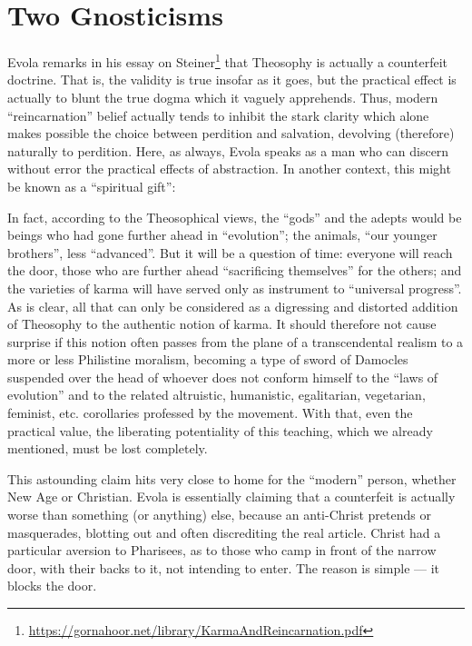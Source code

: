 \section{Two Gnosticisms}

Evola remarks in his essay on Steiner\footnote{\url{https://gornahoor.net/library/KarmaAndReincarnation.pdf}} that Theosophy is actually a counterfeit doctrine. That is, the validity is true insofar as it goes, but the practical effect is actually to blunt the true dogma which it vaguely apprehends. Thus, modern ``reincarnation'' belief actually tends to inhibit the stark clarity which alone makes possible the choice between perdition and salvation, devolving (therefore) naturally to perdition. Here, as always, Evola speaks as a man who can discern without error the practical effects of abstraction. In another context, this might be known as a ``spiritual gift'':

\begin{quotex}
In fact, according to the Theosophical views, the ``gods'' and the adepts would be beings who had gone further ahead in ``evolution''; the animals, ``our younger brothers'', less ``advanced''. But it will be a question of time: everyone will reach the door, those who are further ahead ``sacrificing themselves'' for the others; and the varieties of karma will have served only as instrument to ``universal progress''. As is clear, all that can only be considered as a digressing and distorted addition of Theosophy to the authentic notion of karma. It should therefore not cause surprise if this notion often passes from the plane of a transcendental realism to a more or less Philistine moralism, becoming a type of sword of Damocles suspended over the head of whoever does not conform himself to the ``laws of evolution'' and to the related altruistic, humanistic, egalitarian, vegetarian, feminist, etc. corollaries professed by the movement. With that, even the practical value, the liberating potentiality of this teaching, which we already mentioned, must be lost completely.
\end{quotex}


This astounding claim hits very close to home for the ``modern'' person, whether New Age or Christian. Evola is essentially claiming that a counterfeit is actually worse than something (or anything) else, because an anti-Christ pretends or masquerades, blotting out and often discrediting the real article. Christ had a particular aversion to Pharisees, as to those who camp in front of the narrow door, with their backs to it, not intending to enter. The reason is simple --- it blocks the door.

